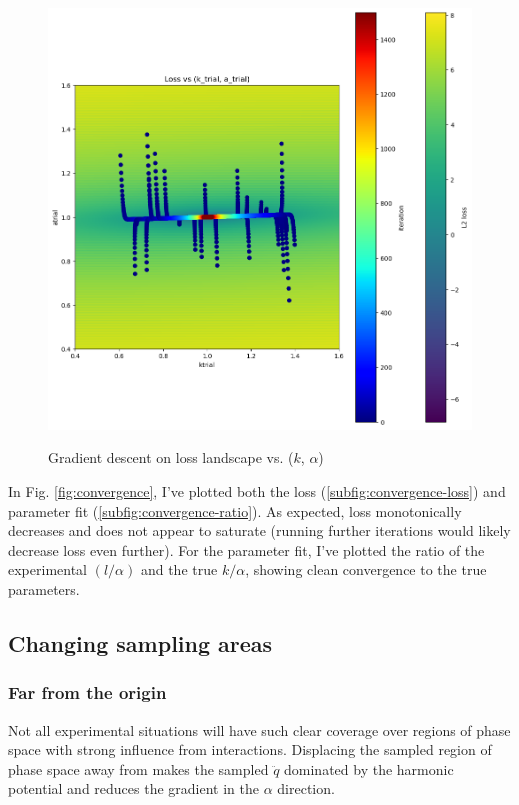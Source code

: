 \documentclass[]{article}
\begin{document}
\begin{figure}[H]
	\caption{Gradient descent on loss landscape vs. ($k$, $\alpha$)}
	\centering
	\includegraphics[scale=0.60]{gradient-descent-paths.png}
	\label{fig:gradient-descent-paths}
\end{figure}

In Fig. \ref{fig:convergence}, I've plotted both the loss (\ref{subfig:convergence-loss}) and parameter fit (\ref{subfig:convergence-ratio}). As expected, loss monotonically decreases and does not appear to saturate (running further iterations would likely decrease loss even further). For the parameter fit, I've plotted the ratio of the experimental $(l/\alpha)$ and the true $k/\alpha$, showing clean convergence to the true parameters.

\subsection{Changing sampling areas}
\subsubsection{Far from the origin}
Not all experimental situations will have such clear coverage over regions of phase space with strong influence from interactions. Displacing the sampled region of phase space away from makes the sampled $\ddot{q}$ dominated by the harmonic potential and reduces the gradient in the $\alpha$ direction.
\end{document}
